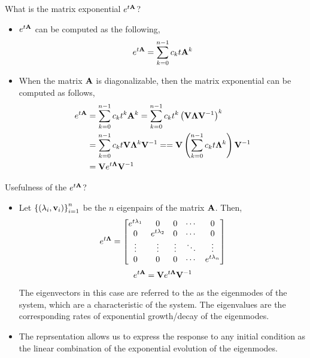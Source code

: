 \documentclass[aspectratio=169]{beamer}
\let\olditem\item
\renewcommand{\item}{\setlength{\itemsep}{\fill}\olditem}
\def\mf{\ensuremath\mathbf}
\def\lp{\ensuremath\left(}
\def\rp{\ensuremath\right)}
\def\lc{\ensuremath\left\{}
\def\rc{\ensuremath\right\}}
\def\emx{\ensuremath\end{bmatrix*}}
\def\bmxc{\ensuremath\begin{bmatrix*}[c]}
\newcommand{\ct}[1]{\lp #1\rp}
\begin{document}
\begin{frame}[t]{What is the matrix exponential $e^{t\mf{A}}$?}
\begin{itemize}
    \item $e^{t\mf{A}}$ can be computed as the following,
    \[e^{t\mf{A}} = \sum_{k=0}^{n-1} c_kt\mf{A}^k \]
    
    \item When the matrix $\mf{A}$ is diagonalizable, then the matrix exponential can be computed as follows,
    \[\begin{split}
        e^{t\mf{A}} &= \sum_{k=0}^{n-1} c_kt^k\mf{A}^k = \sum_{k=0}^{n-1} c_kt^k\ct{\mf{V}\mf{\Lambda}\mf{V}^{-1}}^k \\
        &= \sum_{k=0}^{n-1} c_kt\mf{V}\mf{\Lambda}^k\mf{V}^{-1} = = \mf{V}\ct{\sum_{k=0}^{n-1} c_kt\mf{\Lambda}^k}\mf{V}^{-1}\\
        &= \mf{V}e^{t\mf{\Lambda}}\mf{V}^{-1}\\
    \end{split}
    \]
\end{itemize}
\end{frame}


\begin{frame}[t]{Usefulness of the $e^{t\mf{A}}$?}
\begin{itemize}
    \item Let $\lc \ct{\lambda_i, \mf{v}_i} \rc_{i=1}^n$ be the $n$ eigenpairs of the matrix $\mf{A}$. Then, 
    \[ e^{t\mf{\Lambda}} = \bmxc
    e^{t \lambda_1} & 0 & 0 & \cdots & 0\\
    0 & e^{t \lambda_2} & 0 & \cdots & 0\\
    \vdots & \vdots & \vdots & \ddots & \vdots\\
    0 & 0 & 0 & \cdots & e^{t\lambda_n}
    \emx\]
    \[ e^{t\mf{A}} = \mf{V}e^{t\mf{\Lambda}}\mf{V}^{-1} \]
    
    The eigenvectors in this case are referred to the as the eigenmodes of the system, which are a characteristic of the system. The eigenvalues are the corresponding rates of exponential growth/decay of the eigenmodes.

    \item The reprsentation allows us to express the response to any initial condition as the linear combination of the exponential evolution of the eigenmodes.
\end{itemize}
\end{frame}
\end{document}
